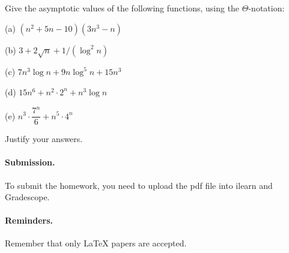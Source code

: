 \documentclass{article}
\begin{document}

\begin{problem}
Give the asymptotic values of the
following functions, using the $\Theta$-notation:
%
\begin{description}
%
\item{(a)} $ (n^2 + 5 n - 10)( 3 n^3 - n)$
\item{(b)} $3 + 2 \sqrt{n} + 1/(\log^2 n)$
\item{(c)} $7n^3\log n + 9 n\log^5n + 15n^3$
\item{(d)} $15n^6 + n^2\cdot 2^n + n^3\log n$
\item{(e)} $n^3 \cdot \dfrac{7^n}{6} + n^5 \cdot 4^n$
%
\end{description}
%
Justify your answers.

\end{problem}


\vskip 0.1in
\paragraph{Submission.}
To submit the homework, you need to upload the pdf file into ilearn and Gradescope.

\paragraph{Reminders.}
Remember that only {\LaTeX} papers are accepted. 
\end{document}
